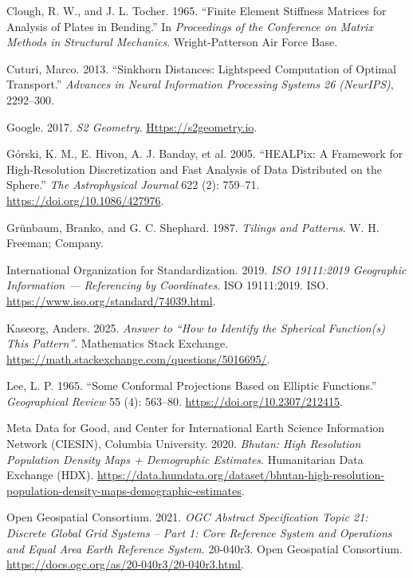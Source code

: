 \documentclass[
  11pt,
  a4paper,
]{article}
\newlength{\cslhangindent}
\newenvironment{CSLReferences}[2] %
 {\begin{list}{}{%
  \setlength{\itemindent}{0pt}
  \setlength{\leftmargin}{0pt}
  \setlength{\parsep}{0pt}
  \ifodd #1
   \setlength{\leftmargin}{\cslhangindent}
   \setlength{\itemindent}{-1\cslhangindent}
  \fi
  \setlength{\itemsep}{#2\baselineskip}}}
 {\end{list}}
\begin{document}
\protect{}\label{refs}
\begin{CSLReferences}{1}{1}
Clough, R. W., and J. L. Tocher. 1965. {``Finite Element Stiffness
Matrices for Analysis of Plates in Bending.''} In \emph{Proceedings of
the Conference on Matrix Methods in Structural Mechanics}.
Wright-Patterson Air Force Base.

Cuturi, Marco. 2013. {``Sinkhorn Distances: Lightspeed Computation of
Optimal Transport.''} \emph{Advances in Neural Information Processing
Systems 26 (NeurIPS)}, 2292--300.

Google. 2017. \emph{S2 Geometry}.
\href{https://s2geometry.io}{Https://s2geometry.io}.

Górski, K. M., E. Hivon, A. J. Banday, et al. 2005. {``HEALPix: A
Framework for High-Resolution Discretization and Fast Analysis of Data
Distributed on the Sphere.''} \emph{The Astrophysical Journal} 622 (2):
759--71. \url{https://doi.org/10.1086/427976}.

Grünbaum, Branko, and G. C. Shephard. 1987. \emph{Tilings and Patterns}.
W. H. Freeman; Company.

International Organization for Standardization. 2019. \emph{ISO
19111:2019 Geographic Information --- Referencing by Coordinates}. ISO
19111:2019. ISO. \url{https://www.iso.org/standard/74039.html}.

Kaseorg, Anders. 2025. \emph{Answer to {``How to Identify the Spherical
Function(s) This Pattern''}}. Mathematics Stack Exchange.
\url{https://math.stackexchange.com/questions/5016695/}.

Lee, L. P. 1965. {``Some Conformal Projections Based on Elliptic
Functions.''} \emph{Geographical Review} 55 (4): 563--80.
\url{https://doi.org/10.2307/212415}.

Meta Data for Good, and Center for International Earth Science
Information Network (CIESIN), Columbia University. 2020. \emph{Bhutan:
High Resolution Population Density Maps + Demographic Estimates}.
Humanitarian Data Exchange (HDX).
\url{https://data.humdata.org/dataset/bhutan-high-resolution-population-density-maps-demographic-estimates}.

Open Geospatial Consortium. 2021. \emph{OGC Abstract Specification Topic
21: Discrete Global Grid Systems -- Part 1: Core Reference System and
Operations and Equal Area Earth Reference System}. 20-040r3. Open
Geospatial Consortium.
\url{https://docs.ogc.org/as/20-040r3/20-040r3.html}.


\end{CSLReferences}
\end{document}
